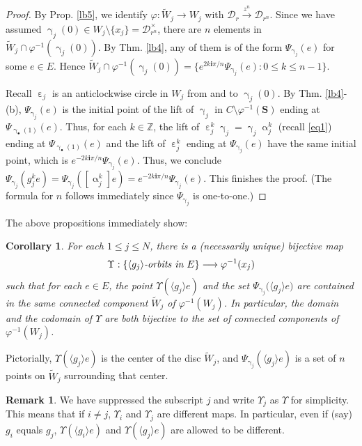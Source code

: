 \documentclass[11pt,b5paper,notitlepage]{article}
\theoremstyle{definition}
\newtheorem{rem}[df]{Remark}
\theoremstyle{plain}
\newtheorem{co}[df]{Corollary}
\newcommand{\mc}{\mathcal}
\newcommand{\wtd}{\widetilde}
\newcommand{\bk}[1]{\langle {#1}\rangle}
\newcommand{\im}{\mathbf{i}}
\newcommand{\blt}{\bullet}
\newcommand{\Zbb}{\mathbb Z}
\newcommand{\Sbf}{\mathbf{S}}
\numberwithin{equation}{subsection}
\begin{document}
\begin{proof}
By Prop. \ref{lb5}, we identify $\varphi:\wtd W_j\rightarrow W_j$ with $\mc D_r\xrightarrow{z^n}\mc D_{r^n}$. Since we have assumed $\upgamma_j(0)\in W_j\setminus\{x_j\}=\mc D_{r^n}^\times$,  there are $n$ elements in $\wtd W_j\cap\varphi^{-1}(\upgamma_j(0))$. By Thm. \ref{lb4}, any of them is of the form $\Psi_{\upgamma_j}(e)$ for some $e\in E$. Hence $\wtd W_j\cap\varphi^{-1}(\upgamma_j(0))=\{e^{2k\im\pi/n}\Psi_{\upgamma_j}(e):0\leq k\leq n-1\}$.

Recall $\upepsilon_j$ is an anticlockwise circle in $W_j$ from and to $\upgamma_j(0)$. By Thm. \ref{lb4}-(b), $\Psi_{\upgamma_j}(e)$ is the initial point of the lift of $\upgamma_j$ in $C\setminus\varphi^{-1}(\Sbf)$ ending at $\Psi_{\upgamma_\blt(1)}(e)$. Thus, for each $k\in\Zbb$, the lift of $\upepsilon_j^k\upgamma_j=\upgamma_j\upalpha_j^k$ (recall \eqref{eq1}) ending at $\Psi_{\upgamma_\blt(1)}(e)$ and the lift of $\upepsilon_j^k$ ending at $\Psi_{\upgamma_j}(e)$ have the same initial point, which is $e^{-2k\im\pi/n}\Psi_{\upgamma_j}(e)$. Thus, we conclude $\Psi_{\upgamma_j}(g_j^ke)=\Psi_{\upgamma_j}([\upalpha_j^k] e)=e^{-2k\im\pi/n}\Psi_{\upgamma_j}(e)$. This finishes the proof. (The formula for $n$ follows immediately since $\Psi_{\upgamma_j}$ is one-to-one.)
\end{proof}

The above propositions immediately show:

\begin{co}\label{lb6}
For each $1\leq j\leq N$, there is a (necessarily unique) bijective map 
\begin{align*}
\Upsilon:\{\bk{g_j}\emph{-orbits in }E\}\longrightarrow \varphi^{-1}(x_j)
\end{align*}
such that for each $e\in E$, the point $\Upsilon(\bk{g_j} e)$    and the set $\Psi_{\upgamma_j}\big(\bk{g_j} e\big)$ are contained in the same connected component $\wtd W_j$ of $\varphi^{-1}(W_j)$. In particular, the domain and the codomain of $\Upsilon$ are both bijective to the set of connected components of $\varphi^{-1}(W_j)$.
\end{co}

Pictorially, $\Upsilon(\bk{g_j}e)$ is the center of the disc $\wtd W_j$, and  $\Psi_{\upgamma_j}(\bk{g_j}e)$ is a set of $n$ points on $\wtd W_j$ surrounding that center.

\begin{rem}
We have suppressed the subscript $j$ and write $\Upsilon_j$ as $\Upsilon$ for simplicity. This means that if $i\neq j$,  $\Upsilon_i$ and $\Upsilon_j$ are different maps. In particular, even if (say) $g_i$ equals $g_j$, $\Upsilon(\bk{g_i}e)$ and $\Upsilon(\bk{g_j}e)$ are allowed to be different.	
\end{rem}
\end{document}
